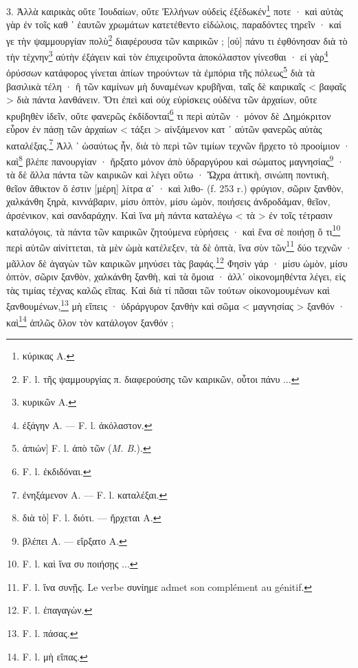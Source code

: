 \documentclass[a4paper, 11pt, oneside, polutonikogreek, french]{article}
\begin{document}
3. Ἀλλὰ καιρικὰς οὔτε Ἰουδαίων, οὔτε Ἑλλήνων οὐδεὶς ἐξέδωκέν\footnote{κύρικας A.} ποτε · καὶ αὐτὰς γὰρ ἐν τοῖς καθ ᾽ ἑαυτῶν χρωμάτων κατετέθεντο εἰδώλοις, παραδόντες τηρεῖν · καί γε τὴν ψαμμουργίαν πολὺ\footnote{F. l. τῆς ψαμμουργίας π. διαφερούσης τῶν καιρικῶν, οὗτοι πάνυ ...} διαφέρουσα τῶν καιρικῶν ; [οὐ] πάνυ τι ἐφθόνησαν διὰ τὸ τὴν τέχνην\footnote{κυρικῶν A.} αὐτὴν ἐξάγειν καὶ τὸν ἐπιχειροῦντα ἀποκόλαστον γίνεσθαι · εἰ γὰρ\footnote{ἐξάγην A. --- F. l. ἀκόλαστον.} ὀρύσσων κατάφορος γίνεται ἀπίων τηρούντων τὰ ἐμπόρια τῆς πόλεως\footnote{ἀπιών] F. l. ἀπὸ τῶν (\emph{M. B.}).} διὰ τὰ βασιλικὰ τέλη · ἢ τῶν καμίνων μὴ δυναμένων κρυβῆναι, ταῖς δὲ καιρικαῖς < βαφαῖς > διὰ πάντα λανθάνειν. Ὅτι ἐπεὶ καὶ οὐχ εὑρίσκεις οὐδένα τῶν ἀρχαίων, οὔτε κρυβηθὲν ἰδεῖν, οὔτε φανερῶς ἐκδίδονταί\footnote{F. l. ἐκδιδόναι.} τι περὶ αὐτῶν · μόνον δὲ Δημόκριτον εὗρον ἐν πάσῃ τῶν ἀρχαίων < τάξει > αἰνξάμενον κατ ᾽ αὐτῶν φανερῶς αὐτὰς καταλέξας.\footnote{ἐνηξάμενον A. --- F. l. καταλέξαι.} Ἀλλ ᾽ ὡσαύτως ἦν, διὰ τὸ περὶ τῶν τιμίων τεχνῶν ἤρχετο τὸ προοίμιον · καὶ\footnote{διὰ τὸ] F. l. διότι. --- ἤρχεται A.} βλέπε πανουργίαν · ἤρξατο μόνον ἀπὸ ὑδραργύρου καὶ σώματος μαγνησίας\footnote{βλέπει A. --- εἴρξατο A.} · τὰ δὲ ἄλλα πάντα τῶν καιρικῶν καὶ λέγει οὕτω · Ὤχρα ἀττικὴ, σινώπη ποντικὴ, θεῖον ἄθικτον ὅ ἐστιν [μέρη] λίτρα αʹ · καὶ λιθο- (f. 253 r.) φρύγιον, σῶριν ξανθὸν, χαλκάνθη ξηρὰ, κιννάβαριν, μίσυ ὀπτὸν, μίσυ ὠμὸν, ποιήσεις ἀνδροδάμαν, θεῖον, ἀρσένικον, καὶ σανδαράχην. Καὶ ἵνα μὴ πάντα καταλέγω < τὰ > ἐν τοῖς τέτρασιν καταλόγοις, τὰ πάντα τῶν καιρικῶν ζητούμενα εὑρήσεις · καὶ ἕνα σὲ ποιήσῃ ὅ τι\footnote{F. l. καὶ ἵνα συ ποιήσῃς ...} περὶ αὐτῶν αἰνίττεται, τὰ μὲν ὠμὰ κατέλεξεν, τὰ δὲ ὀπτὰ, ἵνα σὺν τῶν\footnote{F. l. ἵνα συνῇς. Le verbe συνίημε admet son complément au génitif.} δύο τεχνῶν · μᾶλλον δὲ ἀγαγὼν τῶν καιρικῶν μηνύσει τὰς βαφάς.\footnote{F. l. ἐπαγαγὼν.} Φησὶν γάρ · μίσυ ὠμὸν, μίσυ ὀπτὸν, σῶριν ξανθὸν, χαλκάνθη ξανθὴ, καὶ τὰ ὄμοια · ἀλλ᾽ οὶκονομηθέντα λέγει, εὶς τὰς τιμίας τέχνας καλῶς εῖπας. Καὶ διὰ τί πᾶσαι τῶν τούτων οἰκονομουμένων καὶ ξανθουμένων,\footnote{F. l. πάσας.} μὴ εἴπεις · ὑδράργυρον ξανθὴν καὶ σῶμα < μαγνησίας > ξανθόν · καὶ\footnote{F. l. μὴ εἴπας.} ἁπλῶς ὅλον τὸν κατάλογον ξανθόν ;
\end{document}

